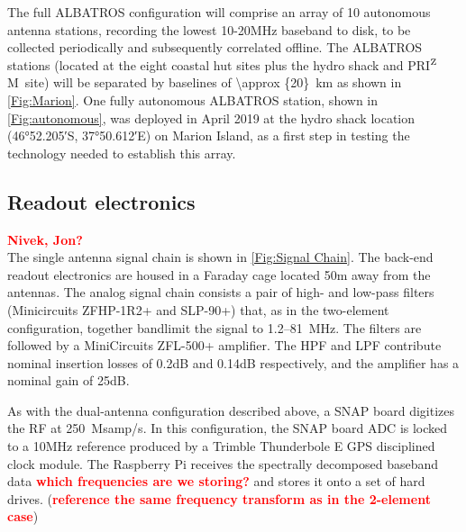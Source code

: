 \documentclass{ws-jai}
\def\prizm{PRI$^{\rm Z}$M}
\newcommand{\attention}[1]{\textcolor{red}{\bf {#1}}}
\begin{document}
The full ALBATROS configuration will comprise an array of 10 autonomous antenna stations, recording the lowest 10-20MHz baseband to disk, to be collected periodically and subsequently correlated offline. The ALBATROS stations (located at the eight coastal hut sites plus the hydro shack and \prizm\ site) will
be separated by baselines of \SI{\approx {20}}{km} as shown in
\autoref{Fig:Marion}. One fully autonomous ALBATROS
station, shown in \autoref{Fig:autonomous}, was deployed in April 2019 at the hydro shack location (\ang{46;52.205;}S, \ang{37;50.612;}E) on Marion Island, as a first step in testing the technology needed to establish this array.



% 

\subsection{Readout electronics}
\attention{Nivek, Jon?} \\

The single antenna signal chain is shown in \autoref{Fig:Signal Chain}. 
The back-end readout electronics are housed in a Faraday cage
located 50m away from the antennas. The analog signal chain consists 
a pair of high- and low-pass filters (Minicircuits
ZFHP-1R2+ and SLP-90+) that, as in the two-element configuration, together bandlimit the signal to
1.2--\SI{81}{MHz}. The filters are followed by a MiniCircuits ZFL-500+ amplifier.  The HPF and LPF contribute nominal insertion losses of 0.2dB and 0.14dB respectively, and the amplifier has a nominal gain of 25dB.

As with the dual-antenna configuration described above, a SNAP board digitizes the RF  at 250~Msamp/s. In this configuration, the SNAP board ADC is locked to a 10MHz reference produced by a Trimble Thunderbole E GPS disciplined clock module. The Raspberry Pi receives the spectrally decomposed baseband data \attention{which frequencies are we storing?} and stores it onto a set of hard drives. 
(\attention{reference the same frequency transform as in the 2-element case})
\end{document}
